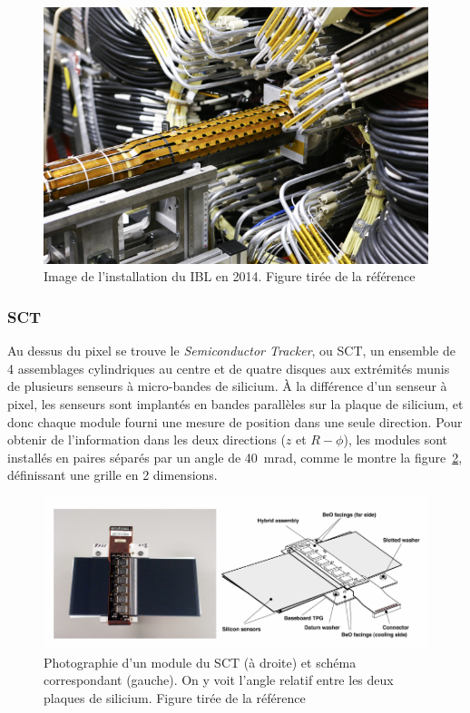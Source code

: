 \begin{figure}[h!]
  \centering
  \includegraphics{ibl.jpg}
  \caption{Image de l'installation du IBL en 2014. Figure tirée de la référence~\cite{MarcelloniDeOliveira:1702006}}
  \label{fig:ibl}
\end{figure}

\subsubsection{SCT}

Au dessus du pixel se trouve le \emph{Semiconductor Tracker}, ou SCT,
un ensemble de 4 assemblages cylindriques au centre et de quatre
disques aux extrémités munis de plusieurs senseurs à micro-bandes de
silicium. À la différence d'un senseur à pixel, les senseurs sont
implantés en bandes parallèles sur la plaque de silicium, et donc
chaque module fourni une mesure de position dans une seule
direction. Pour obtenir de l'information dans les deux directions ($z$
et $R-\phi$), les modules sont installés en paires séparés par un
angle de 40~mrad, comme le montre la figure~\ref{fig:sct}, définissant
une grille en 2 dimensions.

\begin{figure}[h]
  \centering
  \includegraphics{sct.pdf}
  \caption{Photographie d'un module du SCT (à droite) et schéma
    correspondant (gauche). On y voit l'angle relatif entre les deux
    plaques de silicium. Figure tirée de la
    référence~\cite{collaboration_atlas_2008}}
  \label{fig:sct}
\end{figure}

